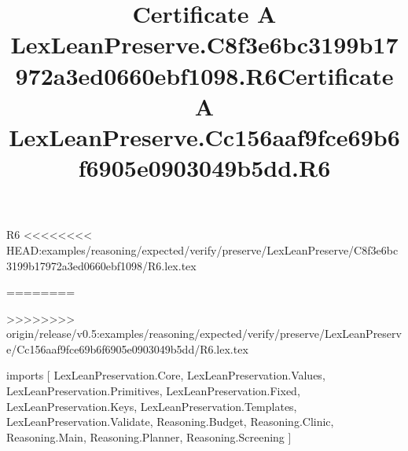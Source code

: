 \begin{lexlean}{R6}
<<<<<<<< HEAD:examples/reasoning/expected/verify/preserve/LexLeanPreserve/C8f3e6bc3199b17972a3ed0660ebf1098/R6.lex.tex
\title{Certificate A LexLeanPreserve.C8f3e6bc3199b17972a3ed0660ebf1098.R6}
========
\title{Certificate A LexLeanPreserve.Cc156aaf9fce69b6f6905e0903049b5dd.R6}
>>>>>>>> origin/release/v0.5:examples/reasoning/expected/verify/preserve/LexLeanPreserve/Cc156aaf9fce69b6f6905e0903049b5dd/R6.lex.tex
\begin{coremodule}
imports [
  LexLeanPreservation.Core,
  LexLeanPreservation.Values,
  LexLeanPreservation.Primitives,
  LexLeanPreservation.Fixed,
  LexLeanPreservation.Keys,
  LexLeanPreservation.Templates,
  LexLeanPreservation.Validate,
  Reasoning.Budget,
  Reasoning.Clinic,
  Reasoning.Main,
  Reasoning.Planner,
  Reasoning.Screening
]


\end{coremodule}
\end{lexlean}
